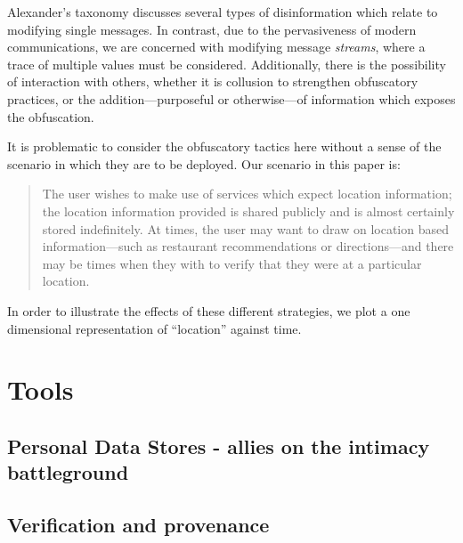 \documentclass{IOS-Book-Article}     %
\begin{document}
Alexander's taxonomy \cite{alexander2010Disinformation} discusses several types
of disinformation which relate to modifying single messages. In contrast, due to
the pervasiveness of modern communications, we are concerned with modifying
message \emph{streams}, where a trace of multiple values must be considered.
Additionally, there is the possibility of interaction with others, whether it is
collusion to strengthen obfuscatory practices, or the addition---purposeful or
otherwise---of information which exposes the obfuscation.

It is problematic to consider the obfuscatory tactics here without a sense of
the scenario in which they are to be deployed. Our scenario in this paper is:
\begin{quote}
The user wishes to make use of services which expect location information; 
the location information provided is shared publicly and is almost
certainly stored indefinitely. At times, the user may want to draw on location
based information---such as restaurant recommendations or directions---and there
may be times when they with to verify that they were at a particular location.
\end{quote}

In order to illustrate the effects of these different strategies, we plot a one
dimensional representation of ``location'' against time.
\section{Tools}

\subsection{Personal Data Stores - allies on the intimacy battleground}

\subsection{Verification and provenance}







\end{document}
